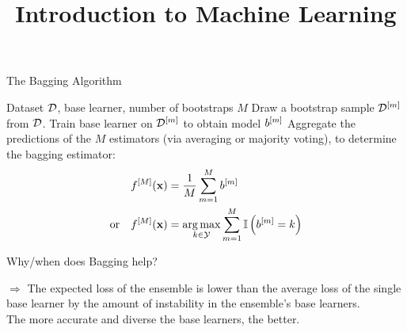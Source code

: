 \documentclass[11pt,compress,t,notes=noshow, xcolor=table]{beamer}
\title{Introduction to Machine Learning}
\institute{\href{https://compstat-lmu.github.io/lecture_i2ml/}{compstat-lmu.github.io/lecture\_i2ml}}
\date{}
\begin{document}
\sloppy

\begin{vbframe}{The Bagging Algorithm}

\begin{algorithm}[H]
  \small
  \caption*{Bagging algorithm}
  \begin{algorithmic}[1]
     Dataset $\mathcal{D}$, base learner, number of bootstraps $M$
      \State Draw a bootstrap sample $\mathcal{D}^{[m]}$ from $\mathcal{D}$.
      \State Train base learner on $\mathcal{D}^{[m]}$ to obtain model $b^{[m]}$
    \EndFor
    \State Aggregate the predictions of the $M$ estimators (via averaging or majority voting), to determine the bagging estimator:
    \begin{align*}
    f^{[M]}(\mathbf{x}) &= \frac{1}{M} \sum_{m=1}^M b^{[m]} \\
    \text{or}\quad f^{[M]}(\mathbf{x}) &= \operatorname*{arg\,max}_{k \in \mathcal{Y}} \sum_{m=1}^M \mathbb{I}\left(b^{[m]} = k\right)
    \end{align*}
  \end{algorithmic}
\end{algorithm}

\end{vbframe}

\begin{vbframe}{Why/when does Bagging help?}

\small
$\Rightarrow$ The expected loss of the ensemble is lower than the average loss of the single base learner by the amount of instability in the ensemble's base learners.\\ The more accurate and diverse the base learners, the better.
\normalsize
\framebreak
\end{vbframe}
\end{document}
